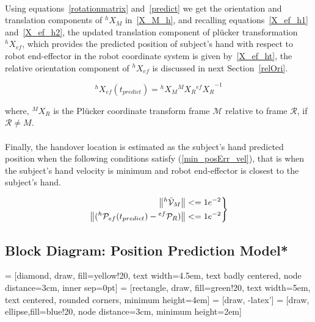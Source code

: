 \paragraph*{}
Using equations~\ref{rotationmatrix} and~\ref{predict} we get the orientation and translation components of ${}^{h}{X}_M$ in~\ref{X_M_h}, and recalling equations~\ref{X_ef_h1} and~\ref{X_ef_h2}, the updated translation component of pl\"ucker transformation ${}^{h}{X}_{ef}$, which provides the predicted position of subject's hand with respect to robot end-effector in the robot coordinate system is given by~\ref{X_ef_ht}, the relative orientation component of ${}^{h}{X}_{ef}$ is discussed in next Section~\ref{relOri}.

\begin{equation}\label{X_ef_ht}
{}^{h}{X}_{ef}(t_{predict}) =  {}^{h}{X}_M  {}^{M}{X}_R {{}^{ef}{X}_R}^{-1}
\end{equation}

where, ${}^{M}{X}_R$ is the Pl\"ucker coordinate transform frame $\mathcal{M}$ relative to frame $\mathcal{R}$, if $\mathcal R \neq M$.

\paragraph*{}
Finally, the handover location is estimated as the subject's hand predicted position when the following conditions satisfy (\ref{min_posErr_vel}), that is when the subject's hand velocity is minimum and robot end-effector is closest to the subject's hand.

\begin{equation}\label{min_posErr_vel}
\left.\begin{aligned}
\norm{{}^{h}\mathcal{\bar{V}}_{M}}& <= 1e^{-2} \\
\norm{({}^{h}\mathcal{P}_{ef}(t_{predict}) - {}^{ef}\mathcal{P}_{R})} & <= 1e^{-2}
\end{aligned}
\right\}
\end{equation}



\subsection{Block Diagram: Position Prediction Model*}

 = [diamond, draw, fill=yellow!20, 
text width=4.5em, text badly centered, node distance=3cm, inner sep=0pt]
 = [rectangle, draw, fill=green!20, 
text width=5em, text centered, rounded corners, minimum height=4em]
 = [draw, -latex']
 = [draw, ellipse,fill=blue!20, node distance=3cm,
minimum height=2em]


